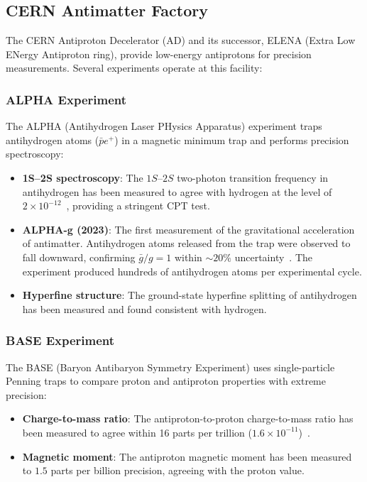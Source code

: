 \documentclass[12pt]{article}
\theoremstyle{definition}
\theoremstyle{remark}
\begin{document}
\subsection{CERN Antimatter Factory}

The CERN Antiproton Decelerator (AD) and its successor, ELENA (Extra Low ENergy
Antiproton ring), provide low-energy antiprotons for precision measurements.
Several experiments operate at this facility:

\subsubsection{ALPHA Experiment}

The ALPHA (Antihydrogen Laser PHysics Apparatus) experiment traps antihydrogen
atoms ($\bar{p}e^+$) in a magnetic minimum trap and performs precision spectroscopy:

\begin{itemize}
    \item \textbf{1S--2S spectroscopy}: The $1S$--$2S$ two-photon transition frequency
    in antihydrogen has been measured to agree with hydrogen at the level of
    $2 \times 10^{-12}$~\cite{ALPHA2020}, providing a stringent CPT test.

    \item \textbf{ALPHA-g (2023)}: The first measurement of the gravitational acceleration
    of antimatter. Antihydrogen atoms released from the trap were observed to fall
    downward, confirming $\bar{g}/g = 1$ within $\sim 20\%$ uncertainty~\cite{ALPHA2023}.
    The experiment produced hundreds of antihydrogen atoms per experimental cycle.

    \item \textbf{Hyperfine structure}: The ground-state hyperfine splitting of
    antihydrogen has been measured and found consistent with hydrogen.
\end{itemize}

\subsubsection{BASE Experiment}

The BASE (Baryon Antibaryon Symmetry Experiment) uses single-particle Penning traps
to compare proton and antiproton properties with extreme precision:

\begin{itemize}
    \item \textbf{Charge-to-mass ratio}: The antiproton-to-proton charge-to-mass ratio
    has been measured to agree within 16 parts per trillion ($1.6 \times 10^{-11}$)~\cite{BASE2022}.

    \item \textbf{Magnetic moment}: The antiproton magnetic moment has been measured
    to $1.5$ parts per billion precision, agreeing with the proton value.
\end{itemize}
\end{document}
